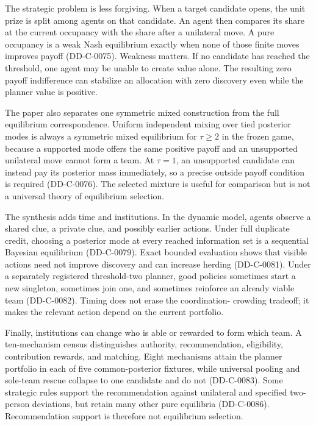 \documentclass[11pt]{article}
\begin{document}
The strategic problem is less forgiving. When a target candidate opens, the
unit prize is split among agents on that candidate. An agent then compares its
share at the current occupancy with the share after a unilateral move. A pure
occupancy is a weak Nash equilibrium exactly when none of those finite moves
improves payoff (DD-C-0075). Weakness matters. If no candidate has reached the
threshold, one agent may be unable to create value alone. The resulting zero
payoff indifference can stabilize an allocation with zero discovery even while
the planner value is positive.

The paper also separates one symmetric mixed construction from the full
equilibrium correspondence. Uniform independent mixing over tied posterior
modes is always a symmetric mixed equilibrium for $\tau\geq2$ in the frozen
game, because a supported mode offers the same positive payoff and an
unsupported unilateral move cannot form a team. At $\tau=1$, an unsupported
candidate can instead pay its posterior mass immediately, so a precise outside
payoff condition is required (DD-C-0076). The selected mixture is useful for
comparison but is not a universal theory of equilibrium selection.

The synthesis adds time and institutions. In the dynamic model, agents observe
a shared clue, a private clue, and possibly earlier actions. Under full
duplicate credit, choosing a posterior mode at every reached information set is
a sequential Bayesian equilibrium (DD-C-0079). Exact bounded evaluation shows
that visible actions need not improve discovery and can increase herding
(DD-C-0081). Under a separately registered threshold-two planner, good policies
sometimes start a new singleton, sometimes join one, and sometimes reinforce
an already viable team (DD-C-0082). Timing does not erase the coordination-
crowding tradeoff; it makes the relevant action depend on the current portfolio.

Finally, institutions can change who is able or rewarded to form which team.
A ten-mechanism census distinguishes authority, recommendation, eligibility,
contribution rewards, and matching. Eight mechanisms attain the planner
portfolio in each of five common-posterior fixtures, while universal pooling
and sole-team rescue collapse to one candidate and do not (DD-C-0083). Some
strategic rules support the recommendation against unilateral and specified
two-person deviations, but retain many other pure equilibria (DD-C-0086).
Recommendation support is therefore not equilibrium selection.
\end{document}

